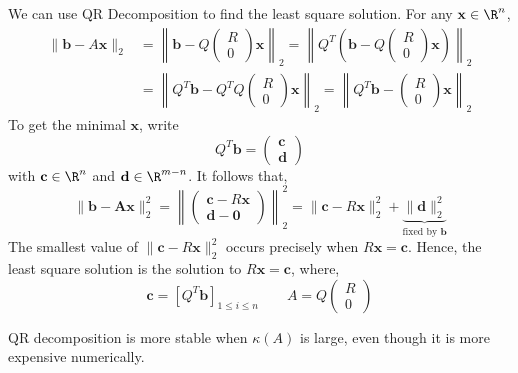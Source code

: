 \begin{rmk}
	We can use QR Decomposition to find the least square solution. For any $\mathbf{x} \in \R^n$,
	\[\begin{aligned}\|\boldsymbol{b}-A \boldsymbol{x}\|_2 &=\left\|\boldsymbol{b}-Q\left(\begin{array}{l}R \\ 0\end{array}\right) \boldsymbol{x}\right\|_2=\left\|Q^T\left(\boldsymbol{b}-Q\left(\begin{array}{c}R \\ 0\end{array}\right) \boldsymbol{x}\right)\right\|_2 \\ &=\left\|Q^T \boldsymbol{b}-Q^T Q\left(\begin{array}{c}R \\ 0\end{array}\right) \boldsymbol{x}\right\|_2=\left\|Q^T \boldsymbol{b}-\left(\begin{array}{c}R \\ 0\end{array}\right) \boldsymbol{x}\right\|_2 \end{aligned}\]
	To get the minimal $\mathbf{x}$, write 
	\[Q^T \boldsymbol{b}=\left(\begin{array}{l}\boldsymbol{c} \\ \boldsymbol{d}\end{array}\right)\]
	with $\mathbf{c} \in \R^n$ and $\mathbf{d} \in \R^{m-n}$. It follows that,
	\[\|\boldsymbol{b}-\boldsymbol{A} \boldsymbol{x}\|_2^2=\left\|\left(\begin{array}{c}\boldsymbol{c}-R \boldsymbol{x} \\ \boldsymbol{d}-\mathbf{0}\end{array}\right)\right\|_2^2=\|\boldsymbol{c}-R \boldsymbol{x}\|_2^2+\underbrace{\|\boldsymbol{d}\|_2^2}_{\text {fixed by } \boldsymbol{b}}\]
	The smallest value of $\|\boldsymbol{c}-R \boldsymbol{x}\|_2^2$ occurs precisely when $R\mathbf{x} = \mathbf{c}$. Hence, the least square solution is the solution to $R \boldsymbol{x}= \mathbf{c}$, where, 
	\[\boldsymbol{c}=\left[Q^T \boldsymbol{b}\right]_{1 \leq i \leq n} \quad \quad A=Q\left(\begin{array}{c}R \\ 0\end{array}\right)\]
\end{rmk}

\begin{rmk}
	QR decomposition is more stable when $\kappa(A)$ is large, even though it is more expensive numerically. 
\end{rmk}

